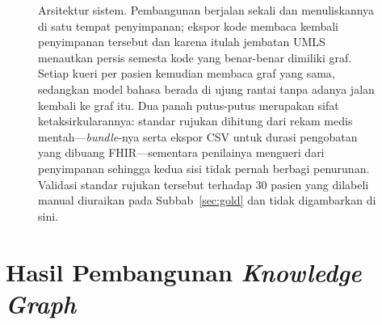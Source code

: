 \begin{figure}[htbp]
{}
\caption{Arsitektur sistem. Pembangunan berjalan sekali dan menuliskannya di satu
tempat penyimpanan; ekspor kode membaca kembali penyimpanan tersebut dan karena itulah jembatan UMLS
menautkan persis semesta kode yang benar-benar dimiliki graf. Setiap kueri per pasien
kemudian membaca graf yang sama, sedangkan model bahasa berada di ujung rantai tanpa adanya jalan
kembali ke graf itu. Dua panah putus-putus merupakan sifat ketaksirkularannya: standar
rujukan dihitung dari rekam medis mentah---\emph{bundle}-nya serta ekspor CSV untuk durasi
pengobatan yang dibuang FHIR---sementara penilainya mengueri dari penyimpanan sehingga kedua sisi
tidak pernah berbagi penurunan. Validasi standar rujukan tersebut terhadap 30 pasien yang
dilabeli manual diuraikan pada Subbab~\ref{sec:gold} dan tidak digambarkan di sini.}
\label{fig:architecture}
\end{figure}

\section{Hasil Pembangunan \emph{Knowledge Graph}}
\label{sec:kg-results}

